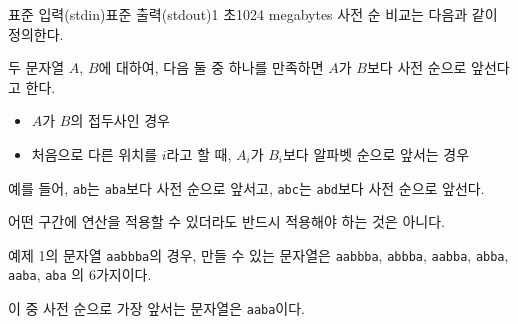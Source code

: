 \begin{problem}{\probtitle}{표준 입력(stdin)}{표준 출력(stdout)}{1 초}{1024 megabytes}
사전 순 비교는 다음과 같이 정의한다.

두 문자열 $A$, $B$에 대하여, 다음 둘 중 하나를 만족하면 $A$가 $B$보다 사전 순으로 앞선다고 한다.

\begin{itemize}[topsep=0pt,noitemsep]
    \item $A$가 $B$의 접두사인 경우
    \item 처음으로 다른 위치를 $i$라고 할 때, $A_i$가 $B_i$보다 알파벳 순으로 앞서는 경우
\end{itemize}

예를 들어, \texttt{ab}는 \texttt{aba}보다 사전 순으로 앞서고, \texttt{abc}는 \texttt{abd}보다 사전 순으로 앞선다.

어떤 구간에 연산을 적용할 수 있더라도 반드시 적용해야 하는 것은 아니다.

예제 1의 문자열 \texttt{aabbba}의 경우, 만들 수 있는 문자열은
\texttt{aabbba}, \texttt{abbba}, \texttt{aabba}, \texttt{abba}, \texttt{aaba}, \texttt{aba}
의 6가지이다.

이 중 사전 순으로 가장 앞서는 문자열은 \texttt{aaba}이다.

\end{problem}